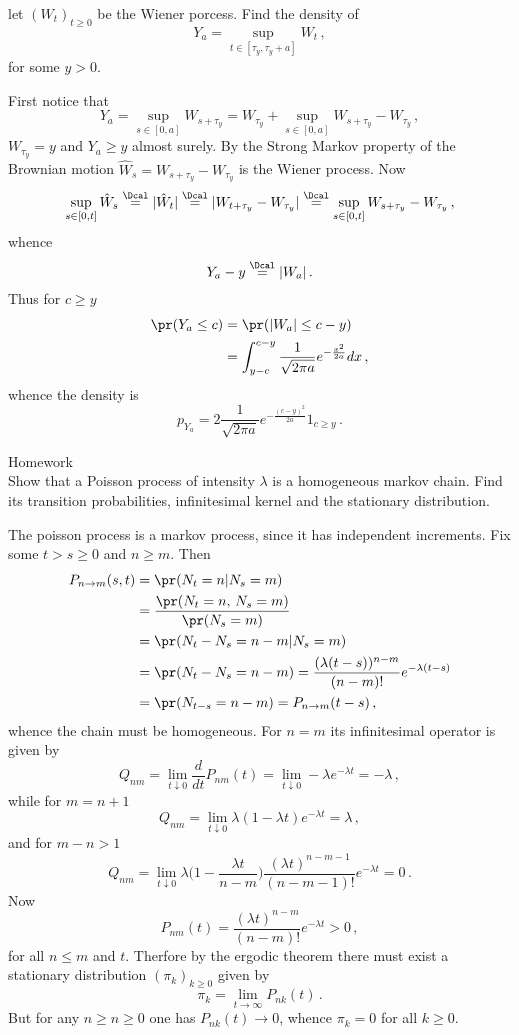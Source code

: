 let $(W_t)_{t\geq0}$ be the Wiener porcess. Find the density of
\[ Y_a = \sup_{t\in[\tau_y,\tau_y+a]} W_t \,,\]
for some $y>0$.

First notice that
\[ Y_a = \sup_{s\in[0,a]} W_{s+\tau_y}
	   = W_{\tau_y} + \sup_{s\in[0,a]} W_{s+\tau_y}-W_{\tau_y} \,,\]
$W_{\tau_y} = y$ and $Y_a\geq y$ almost surely. By the Strong Markov property of
the Brownian motion $\hat{W}_s = W_{s+\tau_y}-W_{\tau_y}$ is the Wiener process.
Now
\[ \sup_{s\in[0,t]} \hat{W}_s \overset{\Dcal}{=}
	|\hat{W}_t| \overset{\Dcal}{=}
	|W_{t+\tau_y}-W_{\tau_y}| \overset{\Dcal}{=}
	\sup_{s\in[0,t]} W_{s+\tau_y}-W_{\tau_y} \,, \]
whence 
\[ Y_a - y \overset{\Dcal}{=} |W_a| \,. \]
Thus for $c\geq y$
\begin{align*}
	\pr(Y_a\leq c) &= \pr(|W_a|\leq c-y)\\
		&= \int_{y-c}^{c-y} \frac{1}{\sqrt{2\pi a}} e^{-\frac{x^2}{2a}} dx\,,
\end{align*}
whence the density is
\[ p_{Y_a} = 2\frac{1}{\sqrt{2\pi a}} e^{-\frac{(c-y)^2}{2a}} 1_{ c\geq y} \,. \]






\noindent Homework\hfill\\
Show that a Poisson process of intensity $\lambda$ is a homogeneous markov chain.
Find its transition probabilities, infinitesimal kernel and the stationary distribution.

The poisson process is a markov process, since it has independent increments.
Fix some $t>s\geq0$ and $n\geq m$. Then
\begin{align*}
	P_{n\to m}(s,t) &= \pr(N_t=n|N_s=m)\\
		&= \frac{\pr(N_t=n,\,N_s=m)}{\pr(N_s=m)} \\
		&= \pr(N_t-N_s=n-m|N_s=m) \\
		&= \pr(N_t-N_s=n-m) = \frac{(\lambda(t-s))^{n-m}}{(n-m)!} e^{-\lambda(t-s)}\\
		&= \pr(N_{t-s} = n-m) = P_{n\to m}(t-s) \,,
\end{align*}
whence the chain must be homogeneous. For $n=m$ its infinitesimal operator is given
by
\[ Q_{nm} = \lim_{t\downarrow 0} \frac{d}{dt} P_{nm}(t)
	= \lim_{t\downarrow 0} -\lambda e^{-\lambda t}
	= -\lambda \,, \]
while for $m=n+1$
\[ Q_{nm} = \lim_{t\downarrow 0} \lambda ( 1 - \lambda t ) e^{-\lambda t} = \lambda \,, \]
and for $m-n>1$
\[ Q_{nm} = \lim_{t\downarrow 0} \lambda \biggl( 1 - \frac{\lambda t}{n-m} \biggr)
				\frac{(\lambda t)^{n-m-1}}{(n-m-1)!} e^{-\lambda t} = 0 \,. \]
Now
\[ P_{nm}(t) = \frac{(\lambda t)^{n-m}}{(n-m)!} e^{-\lambda t} > 0\,,\]
for all $n\leq m$ and $t$. Therfore by the ergodic theorem there must exist a
stationary distribution $(\pi_k)_{k\geq0}$ given by 
\[ \pi_k = \lim_{t\to\infty} P_{nk}(t) \,. \]
But for any $n\geq n\geq 0$ one has $P_{nk}(t) \to 0$, whence $\pi_k = 0$ for
all $k\geq 0$.

